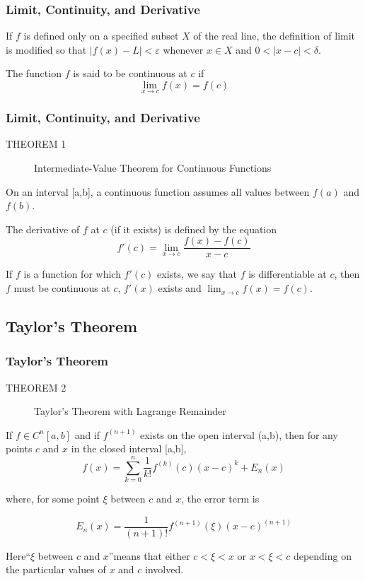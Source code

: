 \documentclass[notheorems,mathserif,table,compress]{beamer}  %
\begin{document}
\begin{frame}
\frametitle{Limit, Continuity, and Derivative}
If $f$ is defined only on a specified subset $X$ of the real line, the definition of limit is modified so that $|f(x)−L| < \varepsilon$ whenever $x \in X$ and $0<|x−c|<\delta$.
\newline

The function $f$ is said to be continuous at $c$ if
\begin{displaymath}
\lim_{x \to c}f(x)=f(c)
\end{displaymath}

\end{frame}

\begin{frame}
\frametitle{Limit, Continuity, and Derivative}
\begin{description}
\item[THEOREM 1] \textsf{Intermediate-Value Theorem for Continuous Functions}
\end{description}
On an interval [a,b], a continuous function assumes all values between $f(a)$ and $f(b)$. 
\newline

The derivative of $f$ at $c$ (if it exists) is defined by the equation
\begin{displaymath}
f '(c)=\lim_{x \to c}\frac{f(x)-f(c)}{x-c}
\end{displaymath}

If $f$ is a function for which $f '(c)$ exists, we say that $f$ is differentiable at $c$, then $f$ must be continuous at $c$, $f '(x)$ exists and $\lim_{x \to c}f(x)=f(c)$.
\end{frame}

\subsection{Taylor's Theorem}

\begin{frame}
\frametitle{Taylor's Theorem}
\begin{description}
\item[THEOREM 2] \textsf{Taylor's Theorem with Lagrange Remainder}
\end{description}
If $f \in C^ n [a,b] $ and if $f^{(n+1)}$ exists on the open interval (a,b), then for any points $c$ and $x$ in the closed interval [a,b], 
\begin{displaymath}
f(x)=\sum_{k=0}^n \frac{1}{k!}f^{(k)}(c)(x-c)^k+E_n(x)
\end{displaymath}

where, for some point $\xi$ between $c$ and $x$, the error term is

\begin{displaymath}
E_n(x)=\frac{1}{(n+1)!}f^{(n+1)}(\xi)(x-c)^{(n+1)}
\end{displaymath}

Here``$\xi$ between $c$ and $x$''means that either $c<\xi<x$ or $x<\xi<c$ depending on the particular values of $x$ and $c$ involved.
\end{frame}
\end{document}
